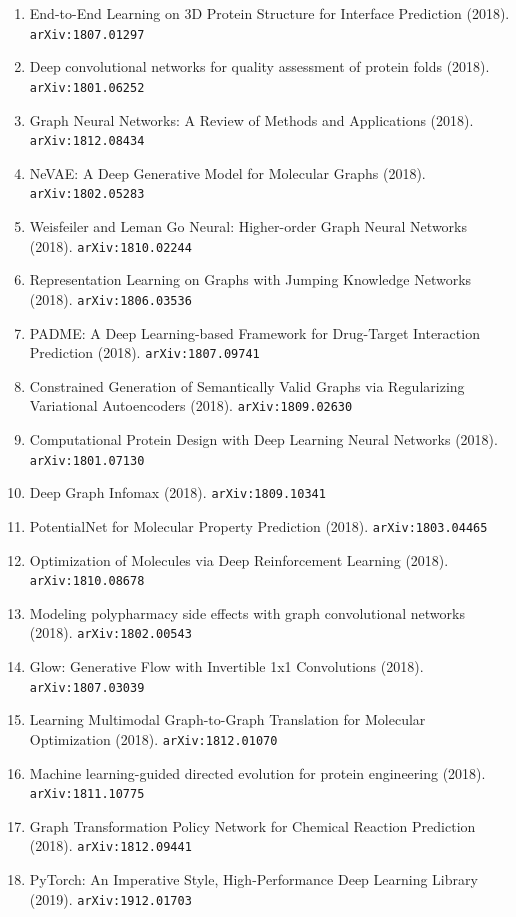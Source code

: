 \documentclass[11pt]{article}
\begin{document}
\begin{enumerate}
  Models (2018). \texttt{arXiv:1811.12823}
  \item End-to-End Learning on 3D Protein Structure for Interface Prediction (2018). \texttt{arXiv:1807.01297}
  \item Deep convolutional networks for quality assessment of protein folds (2018). \texttt{arXiv:1801.06252}
  \item Graph Neural Networks: A Review of Methods and Applications (2018). \texttt{arXiv:1812.08434}
  \item NeVAE: A Deep Generative Model for Molecular Graphs (2018). \texttt{arXiv:1802.05283}
  \item Weisfeiler and Leman Go Neural: Higher-order Graph Neural Networks (2018). \texttt{arXiv:1810.02244}
  \item Representation Learning on Graphs with Jumping Knowledge Networks (2018). \texttt{arXiv:1806.03536}
  \item PADME: A Deep Learning-based Framework for Drug-Target Interaction
  Prediction (2018). \texttt{arXiv:1807.09741}
  \item Constrained Generation of Semantically Valid Graphs via Regularizing
  Variational Autoencoders (2018). \texttt{arXiv:1809.02630}
  \item Computational Protein Design with Deep Learning Neural Networks (2018). \texttt{arXiv:1801.07130}
  \item Deep Graph Infomax (2018). \texttt{arXiv:1809.10341}
  \item PotentialNet for Molecular Property Prediction (2018). \texttt{arXiv:1803.04465}
  \item Optimization of Molecules via Deep Reinforcement Learning (2018). \texttt{arXiv:1810.08678}
  \item Modeling polypharmacy side effects with graph convolutional networks (2018). \texttt{arXiv:1802.00543}
  \item Glow: Generative Flow with Invertible 1x1 Convolutions (2018). \texttt{arXiv:1807.03039}
  \item Learning Multimodal Graph-to-Graph Translation for Molecular
  Optimization (2018). \texttt{arXiv:1812.01070}
  \item Machine learning-guided directed evolution for protein engineering (2018). \texttt{arXiv:1811.10775}
  \item Graph Transformation Policy Network for Chemical Reaction Prediction (2018). \texttt{arXiv:1812.09441}
  \item PyTorch: An Imperative Style, High-Performance Deep Learning Library (2019). \texttt{arXiv:1912.01703}

\end{enumerate}
\end{document}

